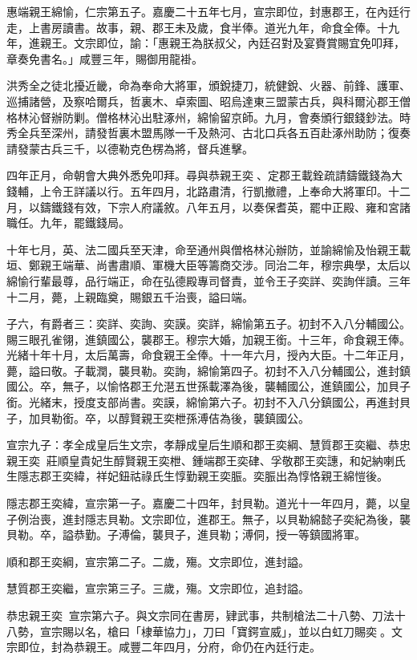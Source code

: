 \begin{pinyinscope}
惠端親王綿愉，仁宗第五子。嘉慶二十五年七月，宣宗即位，封惠郡王，在內廷行走，上書房讀書。故事，親、郡王未及歲，食半俸。道光九年，命食全俸。十九年，進親王。文宗即位，諭：「惠親王為朕叔父，內廷召對及宴賚賞賜宜免叩拜，章奏免書名。」咸豐三年，賜御用龍褂。

洪秀全之徒北擾近畿，命為奉命大將軍，頒銳捷刀，統健銳、火器、前鋒、護軍、巡捕諸營，及察哈爾兵，哲裏木、卓索圖、昭烏達東三盟蒙古兵，與科爾沁郡王僧格林沁督辦防剿。僧格林沁出駐涿州，綿愉留京師。九月，會奏頒行銀錢鈔法。時秀全兵至深州，請發哲裏木盟馬隊一千及熱河、古北口兵各五百赴涿州助防；復奏請發蒙古兵三千，以德勒克色楞為將，督兵進擊。

四年正月，命朝會大典外悉免叩拜。尋與恭親王奕、定郡王載銓疏請鑄鐵錢為大錢輔，上令王詳議以行。五年四月，北路肅清，行凱撤禮，上奉命大將軍印。十二月，以鑄鐵錢有效，下宗人府議敘。八年五月，以奏保耆英，罷中正殿、雍和宮諸職任。九年，罷鐵錢局。

十年七月，英、法二國兵至天津，命至通州與僧格林沁辦防，並諭綿愉及怡親王載垣、鄭親王端華、尚書肅順、軍機大臣等籌商交涉。同治二年，穆宗典學，太后以綿愉行輩最尊，品行端正，命在弘德殿專司督責，並令王子奕詳、奕詢伴讀。三年十二月，薨，上親臨奠，賜銀五千治喪，謚曰端。

子六，有爵者三：奕詳、奕詢、奕謨。奕詳，綿愉第五子。初封不入八分輔國公。賜三眼孔雀翎，進鎮國公，襲郡王。穆宗大婚，加親王銜。十三年，命食親王俸。光緒十年十月，太后萬壽，命食親王全俸。十一年六月，授內大臣。十二年正月，薨，謚曰敬。子載潤，襲貝勒。奕詢，綿愉第四子。初封不入八分輔國公，進封鎮國公。卒，無子，以愉恪郡王允潖五世孫載澤為後，襲輔國公，進鎮國公，加貝子銜。光緒末，授度支部尚書。奕謨，綿愉第六子。初封不入八分鎮國公，再進封貝子，加貝勒銜。卒，以醇賢親王奕枻孫溥佶為後，襲鎮國公。

宣宗九子：孝全成皇后生文宗，孝靜成皇后生順和郡王奕綱、慧質郡王奕繼、恭忠親王奕，莊順皇貴妃生醇賢親王奕枻、鍾端郡王奕硉、孚敬郡王奕譓，和妃納喇氏生隱志郡王奕緯，祥妃鈕祜祿氏生惇勤親王奕脤。奕脤出為惇恪親王綿愷後。

隱志郡王奕緯，宣宗第一子。嘉慶二十四年，封貝勒。道光十一年四月，薨，以皇子例治喪，進封隱志貝勒。文宗即位，進郡王。無子，以貝勒綿懿子奕紀為後，襲貝勒。卒，謚恭勤。子溥倫，襲貝子，進貝勒；溥侗，授一等鎮國將軍。

順和郡王奕綱，宣宗第二子。二歲，殤。文宗即位，進封謚。

慧質郡王奕繼，宣宗第三子。三歲，殤。文宗即位，追封謚。

恭忠親王奕，宣宗第六子。與文宗同在書房，肄武事，共制槍法二十八勢、刀法十八勢，宣宗賜以名，槍曰「棣華協力」，刀曰「寶鍔宣威」，並以白虹刀賜奕。文宗即位，封為恭親王。咸豐二年四月，分府，命仍在內廷行走。


\end{pinyinscope}
